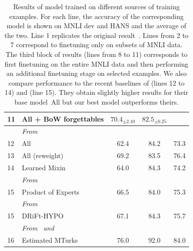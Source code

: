 \begin{table}[ht]
\begin{tabular}{llccc}
\small{11} & All + BoW forgettables    & $70.4_{\pm 2.10}$                     & $82.5_{\pm 0.25}$             &  \\
\midrule
&\emph{From~\citet{clark2019dont}} & & & \\
\small{12} & All & 62.4 & 84.2 & 73.3 \\
\small{13} & All (reweight) & 69.2 & 83.5 & 76.4 \\
\small{14} & Learned Mixin & 64.0 & 84.3 & 74.2\\
\midrule
&\emph{From~\citet{mahabadi2019simple}} & & &  \\
\small{15} & Product of Experts & 66.5 & 84.0 & 75.3     \\
\midrule
&\emph{From~\citet{he2019unlearn}} & & &  \\
\small{15} & DRiFt-HYPO & 67.1 & 84.3 & 75.7     \\
\midrule
&\emph{From~\citet{linzen2019right} and \citet{Nangia_2019}} & & &  \\
\small{16} & Estimated MTurks & 76.0 & 92.0 & 84.0 \\
\bottomrule
\end{tabular}
\caption{Results of \bertbase model trained on different sources of training examples. For each line, the accuracy of the corresponding model is shown on MNLI dev and HANS and the average of the two.  
Line 1 replicates the original \bertbase result~\citep{devlin2018bert}.
Lines from 2 to 7 correspond to finetuning only on subsets of MNLI data. The third block of results (lines from 8 to 11) corresponds to first finetuning \bertbase on the entire MNLI data and then performing an additional finetuning stage on selected examples. We also compare performance to the recent baselines of  (lines 12 to 14) and  (line 15). They obtain slightly higher results for their base model~\textrm{All} but our best model outperforms theirs.}
\label{tab:twoclass}
\end{table}

